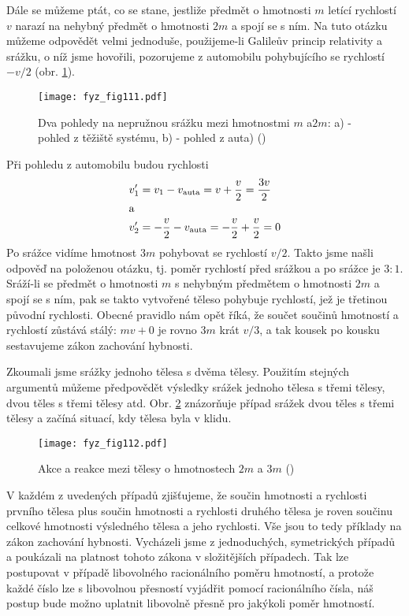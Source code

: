 {{    Dále se můžeme ptát, co se stane, jestliže předmět o hmotnosti \(m\) letící rychlostí \(v\) 
    narazí na nehybný předmět o hmotnosti \(2m\) a spojí se s ním. Na tuto otázku můžeme odpovědět 
    velmi jednoduše, použijeme-li Galileův princip relativity a srážku, o níž jsme hovořili, 
    pozorujeme z automobilu pohybujícího se rychlostí \(-v/2\) (obr. \ref{fyz:fig111}).

    \begin{figure}[ht!]  %
      \centering
      \texttt{[image: fyz\_fig111.pdf]}
      \caption{Dva pohledy na nepružnou srážku mezi hmotnostmi \(m\) a\(2m\): a) - pohled z těžiště 
              systému, b) - pohled z auta)
              (\cite[s.~146]{Feynman01})}
      \label{fyz:fig111}
    \end{figure}
    Při pohledu z automobilu budou rychlosti
    \begin{align*}
      v_1' &= v_1 - v_{\text{auta}} = v + \frac{v}{2} = \frac{3v}{2}   \\
      \shortintertext{a}
      v_2' &= -\frac{v}{2} - v_{\text{auta}} = - \frac{v}{2} + \frac{v}{2} = 0
    \end{align*}
    Po srážce vidíme hmotnost \(3m\) pohybovat se rychlostí \(v/2\). Takto jsme našli odpověď na 
    položenou otázku, tj. poměr rychlostí před srážkou a po srážce je \(3:1\). Sráží-li se předmět 
    o hmotnosti \(m\) s nehybným předmětem o hmotnosti \(2m\) a spojí se s ním, pak se takto 
    vytvořené těleso pohybuje rychlostí, jež je třetinou původní rychlosti. Obecné pravidlo nám 
    opět říká, že součet součinů hmotností a rychlostí zůstává stálý: \(mv + 0\) je rovno \(3m\) 
    krát \(v/3\), a tak kousek po kousku sestavujeme zákon zachování hybnosti.
    
    Zkoumali jsme srážky jednoho tělesa s dvěma tělesy. Použitím stejných argumentů můžeme 
    předpovědět výsledky srážek jednoho tělesa s třemi tělesy, dvou těles s třemi tělesy atd. Obr. 
    \ref{fyz:fig112} znázorňuje případ srážek dvou těles s třemi tělesy a začíná situací, kdy 
    tělesa byla v klidu.
    
    \begin{figure}[ht!]  %
      \centering
      \texttt{[image: fyz\_fig112.pdf]}
      \caption{Akce a reakce mezi tělesy o hmotnostech \(2m\) a \(3m\)
              (\cite[s.~147]{Feynman01})}
      \label{fyz:fig112}
    \end{figure}
    V každém z uvedených případů zjišťujeme, že součin hmotnosti a rychlosti prvního tělesa plus 
    součin hmotnosti a rychlosti druhého tělesa je roven součinu celkové hmotnosti výsledného 
    tělesa a jeho rychlosti. Vše jsou to tedy příklady na zákon zachování hybnosti. Vycházeli jsme 
    z jednoduchých, symetrických případů a poukázali na platnost tohoto zákona v složitějších 
    případech. Tak lze postupovat v případě libovolného racionálního poměru hmotností, a protože 
    každé číslo lze s libovolnou přesností vyjádřit pomocí racionálního čísla, náš postup bude 
    možno uplatnit libovolně přesně pro jakýkoli poměr hmotností.
     
}}
